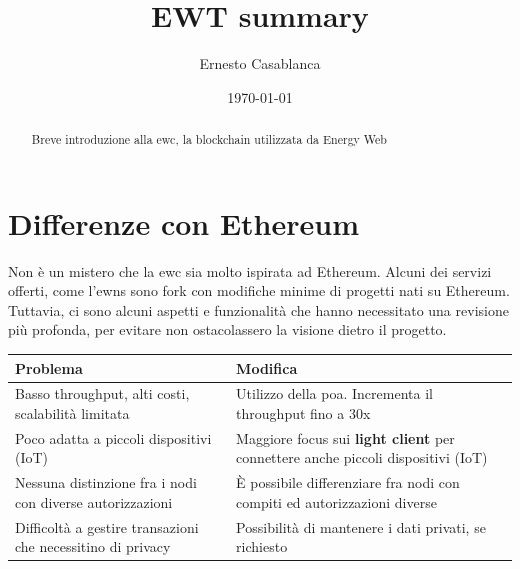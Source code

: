 \documentclass[12pt, letterpaper, twoside]{article}
\title{EWT summary}
\author{Ernesto Casablanca}
\date{\today}
\begin{document}
 
 
\tableofcontents
 
\newpage
 
\begin{abstract}
    Breve introduzione alla \gls{ewc}, la blockchain utilizzata da Energy Web
\end{abstract}
 
\section{Differenze con Ethereum}
Non è un mistero che la \gls{ewc} sia molto ispirata ad Ethereum.
Alcuni dei servizi offerti, come l'\gls{ewns} sono fork con modifiche minime di progetti nati su Ethereum. \\
Tuttavia, ci sono alcuni aspetti e funzionalità che hanno necessitato una revisione più profonda, per evitare non ostacolassero la visione dietro il progetto. \\
 
\begin{tabular}{||p{7cm}|p{7cm}||}
    \hline
    Problema                                                    & Modifica                                                                                \\
    \hline\hline
    Basso throughput, alti costi, scalabilità limitata          & Utilizzo della \gls{poa}. Incrementa il throughput fino a 30x                           \\
    \hline
    Poco adatta a piccoli dispositivi (IoT)                     & Maggiore focus sui \textbf{light client} per connettere anche piccoli dispositivi (IoT) \\
    \hline
    Nessuna distinzione fra i nodi con diverse autorizzazioni   & È possibile differenziare fra nodi con compiti ed autorizzazioni diverse                \\
    \hline
    Difficoltà a gestire transazioni che necessitino di privacy & Possibilità di mantenere i dati privati, se richiesto                                   \\[1ex]
    \hline
\end{tabular}
 
\newpage
 
\end{document}
